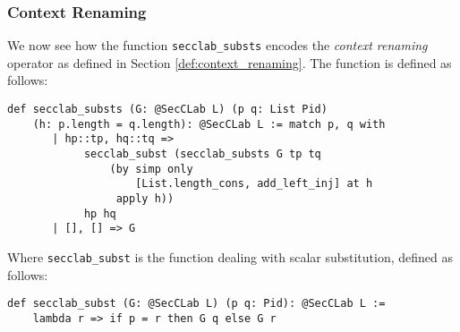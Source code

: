 \documentclass[12pt,a4paper,twoside]{book}
\begin{document}
\subsubsection{Context Renaming}
We now see how the function \texttt{secclab\_substs} encodes the \emph{context renaming} operator as defined in Section \ref{def:context_renaming}. The function is defined as follows:
\begin{samepage}
\begin{verbatim}
def secclab_substs (G: @SecCLab L) (p q: List Pid)
    (h: p.length = q.length): @SecCLab L := match p, q with
       | hp::tp, hq::tq =>
            secclab_subst (secclab_substs G tp tq
                (by simp only 
                    [List.length_cons, add_left_inj] at h
                 apply h))
            hp hq
       | [], [] => G
\end{verbatim}
\end{samepage}
Where \texttt{secclab\_subst} is the function dealing with scalar substitution, defined as follows:
\begin{samepage}
\begin{verbatim}
def secclab_subst (G: @SecCLab L) (p q: Pid): @SecCLab L :=
    lambda r => if p = r then G q else G r
\end{verbatim}
\end{samepage}
\end{document}
